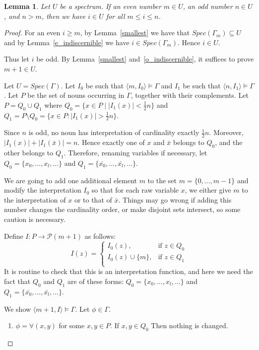 \documentclass[12pt, reqno]{amsart}
\newtheorem{lemma}[theorem]{Lemma}
\theoremstyle{definition}
\theoremstyle{remark}
\numberwithin{equation}{section}
\begin{document}
\begin{lemma}\label{eo_indiscernible}
	Let $U$ be a spectrum. If an even number $m \in U$, an odd number $n \in U$, and $n > m$, then we have $i \in U$ for all $m \leq i \leq n$. 
\end{lemma}
\begin{proof}
	For an even $i\geq m$, by Lemma~\ref{smallest} we have that $Spec(\Gamma_m)\subseteq U$ and by Lemma~\ref{e_indiscernible} we have $i\in Spec(\Gamma_m).$ Hence $i\in U$.
	
	Thus let $i$ be odd. By Lemma~\ref{smallest} and~\ref{o_indiscernible}, it suffices to prove $m +1 \in U$. 
	
	Let $U = Spec(\Gamma)$. Let $I_0$ be such that $\langle m, I_0\rangle \models \Gamma$ and $I_1$ be such that $\langle n, I_1\rangle \models \Gamma$. Let $P$ be the set of nouns occurring in $\Gamma$, together with their complements. Let $P = Q_0 \cup Q_1$ where $Q_0 = \{x \in P \mid |I_1(x)| < \frac{1}{2}n\}$ and $Q_1 = P \setminus Q_0 = \{x\in P:|I_1(x)|> \frac{1}{2}n\}$. 
	
	Since $n$ is odd, no noun has interpretation of cardinality exactly $\frac{1}{2}n$. Moreover, $|I_1(x)|+|I_1(\bar x)|=n.$ Hence exactly one of $x$ and $\bar x$ belongs to $Q_0$, and the other belongs to $Q_1$. Therefore, renaming variables if necessary, let $Q_0 = \{x_0, \dots, x_l, \dots\}$ and $Q_1 = \{\bar{x_0}, \dots, \bar{x_l}, \dots\}$. 
	
	We are going to add one additional element $m$ to the set $m = \{0, \dots, m-1\}$ and modify the interpretation $I_0$ so that for each raw variable $x$, we either give $m$ to the interpretation of $x$ or to that of $\bar{x}$. Things may go wrong if adding this number changes the cardinality order, or make disjoint sets intersect, so some caution is necessary. 
	
	Define $I: P \to \mathcal{P}(m+1)$ as follows: 
	\[
	I(z) = 
	\begin{cases}
    	 I_0(z),& \mbox{if } z \in Q_0 \\
    	I_0(z) \cup \{m\},              & \mbox{if } z \in Q_1 \\
	\end{cases}
	\]
	It is routine to check that this is an interpretation function, and here we need the fact that $Q_0$ and $Q_1$ are of these forms: $Q_0 = \{x_0, \dots, x_l, \dots\}$ and $Q_1 = \{\bar{x_0}, \dots, \bar{x_l}, \dots\}$. 
	
	We show $\langle m+1, I\rangle \models \Gamma$. Let $\phi \in \Gamma$.	
	\begin{enumerate} 
 		 \item $\phi = \forall(x, y)$ for some $x, y \in P$. 
		 If $x, y \in Q_0$ Then nothing is changed. 	
		 	 

\end{enumerate}
\end{proof}
\end{document}

